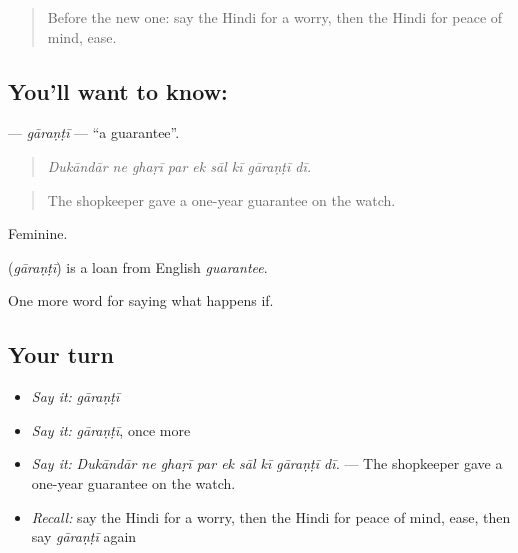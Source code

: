 \label{lesson:HI-C557-garanti}



\begin{quote}
Before the new one: say the Hindi for a worry, then the Hindi for peace of mind, ease.
\end{quote}

\subsection*{You'll want to know: }
\textbf{} — \emph{gāraṇṭī} — \textquotedblleft{}a guarantee\textquotedblright{}.

\begin{quote}
        
\end{quote}

\begin{quote}
\emph{Dukāndār ne ghaṛī par ek sāl kī gāraṇṭī dī.}
\end{quote}

\begin{quote}
The shopkeeper gave a one-year guarantee on the watch.
\end{quote}

Feminine.

\begin{cousinweb}
\textbf{} (\emph{gāraṇṭī}) is a loan from English \emph{guarantee}.
\end{cousinweb}

\begin{grammarlens}[title={What you've built}]
One more word for saying what happens if.
\end{grammarlens}

\subsection*{Your turn}
\begin{itemize}
\raggedright
  \item \emph{Say it:} \emph{gāraṇṭī}
  \item \emph{Say it:} \emph{gāraṇṭī}, once more
  \item \emph{Say it:} \emph{Dukāndār ne ghaṛī par ek sāl kī gāraṇṭī dī.} — The shopkeeper gave a one-year guarantee on the watch.
  \item \emph{Recall:} say the Hindi for a worry, then the Hindi for peace of mind, ease, then say \emph{gāraṇṭī} again
\end{itemize}

